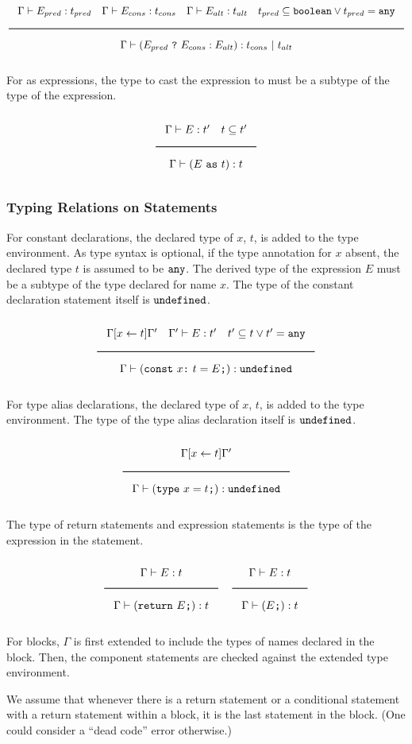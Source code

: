 \noindent
\[
  \Rule{\Gamma \vdash E_{pred} : t_{pred} \quad \Gamma \vdash E_{cons} : t_{cons} \quad \Gamma \vdash E_{alt} : t_{alt}
    \quad t_{pred} \subseteq \Bool \vee t_{pred} = \Any}{\Gamma \vdash (E_{pred}\ \texttt{?}\ E_{cons} : E_{alt}) : t_{cons}\ |\ t_{alt}}
\]
\noindent

For as expressions, the type to cast the expression to must be a subtype of the type of the expression.

\noindent
\[
  \Rule{\Gamma \vdash E : t' \quad t \subseteq t'}{\Gamma \vdash (E\ \texttt{as}\ t) : t}  
\]
\noindent

\subsubsection{Typing Relations on Statements}

For constant declarations, the declared type of $x$, $t$, is added to the type environment.
As type syntax is optional, if the type annotation for $x$ absent, the declared type $t$ is assumed to be $\texttt{any}$.
The derived type of the expression $E$ must be a subtype of the type declared for name $x$.
The type of the constant declaration statement itself is $\texttt{undefined}$.

\noindent
\[
  \Rule{\Gamma [x \leftarrow t] \Gamma' \quad \Gamma' \vdash E : t' \quad t' \subseteq t \vee t' = \Any}{
    \Gamma \vdash (\texttt{const}\ x \texttt{:}\ t = E\texttt{;}) : \Undefined}
\]
\noindent

For type alias declarations, the declared type of $x$, $t$, is added to the type environment.
The type of the type alias declaration itself is $\texttt{undefined}$.

\noindent
\[
  \Rule{\Gamma [x \leftarrow t] \Gamma'}{\Gamma \vdash (\texttt{type}\ x = t\texttt{;}) : \Undefined}
\]
\noindent

The type of return statements and expression statements is the type of the expression in the statement.

\noindent
\[
  \Rule{\Gamma \vdash E : t}{\Gamma \vdash (\texttt{return}\ E\texttt{;}) : t}
  \quad
  \Rule{\Gamma \vdash E : t}{\Gamma \vdash (E\texttt{;}) : t}
\]
\noindent

For blocks, $\Gamma$ is first extended to include the types of names declared in the block.
Then, the component statements are checked against the extended type environment.

We assume that whenever there is a return statement or a conditional statement with a return statement within a
block, it is the last statement in the block. (One could consider a ``dead code'' error otherwise.)

